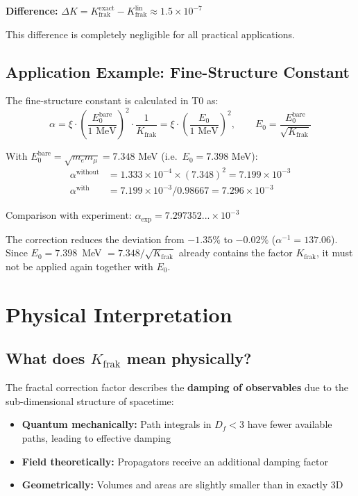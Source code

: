 	\textbf{Difference:} $\Delta K = K_{\text{frak}}^{\text{exact}} - K_{\text{frak}}^{\text{lin}} \approx 1.5 \times 10^{-7}$
	
	This difference is completely negligible for all practical applications.
	
	\subsection{Application Example: Fine-Structure Constant}
	
	The fine-structure constant is calculated in T0 as:
	\begin{equation}
		\alpha = \xi \cdot \left(\frac{E_0^{\text{bare}}}{1 \text{ MeV}}\right)^2 \cdot \frac{1}{K_{\text{frak}}} = \xi \cdot \left(\frac{E_0}{1 \text{ MeV}}\right)^2, \qquad E_0 = \frac{E_0^{\text{bare}}}{\sqrt{K_{\text{frak}}}}
	\end{equation}
	
	With $E_0^{\text{bare}} = \sqrt{m_e m_\mu} = 7.348$ MeV (i.e.\ $E_0 = 7.398$ MeV):
	\begin{align}
		\alpha^{\text{without}} &= 1.333 \times 10^{-4} \times (7.348)^2 = 7.199 \times 10^{-3} \\
		\alpha^{\text{with}} &= 7.199 \times 10^{-3} / 0.98667 = 7.296 \times 10^{-3}
	\end{align}
	
	Comparison with experiment: $\alpha_{\text{exp}} = 7.297352... \times 10^{-3}$
	
	The correction reduces the deviation from $-1.35\%$ to $-0.02\%$ ($\alpha^{-1} = 137.06$). Since $E_0 = 7.398$~MeV $= 7.348/\sqrt{K_{\text{frak}}}$ already contains the factor $K_{\text{frak}}$, it must not be applied again together with $E_0$.
	
	\section{Physical Interpretation}
	
	\subsection{What does $K_{\text{frak}}$ mean physically?}
	
	The fractal correction factor describes the \textbf{damping of observables} due to the sub-dimensional structure of spacetime:
	
	\begin{itemize}
		\item \textbf{Quantum mechanically:} Path integrals in $D_f < 3$ have fewer available paths, leading to effective damping
		\item \textbf{Field theoretically:} Propagators receive an additional damping factor
		\item \textbf{Geometrically:} Volumes and areas are slightly smaller than in exactly 3D
	\end{itemize}
	
